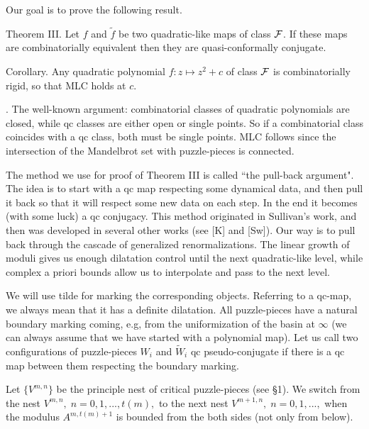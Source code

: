 Our goal is to prove the following result.

\proclaim Theorem III. Let  $f$ and $\tilde f$ be two quadratic-like maps
 of class ${\cal F}$. If these maps are combinatorially
  equivalent then they are quasi-conformally conjugate.

\proclaim Corollary. Any  quadratic polynomial $f: z\mapsto z^2+c$ of 
  class ${\cal F}$ is combinatorially rigid, so that MLC holds at $c$.

. 
The well-known argument: combinatorial classes of quadratic polynomials 
are closed, while qc classes are either open or single points. So if
a combinatorial class coincides with a qc class, both must be single points.
MLC follows since the intersection of the Mandelbrot set with puzzle-pieces
is connected.  \QED 

  

\medskip{} The method we use for proof of 
Theorem III is called ``the pull-back argument". The idea is to start
with a qc map respecting some dynamical data, and then pull it back 
so that it will respect some new data on each step. In the end 
it becomes (with some luck)  a qc conjugacy. This method originated in
Sullivan's work, and then was developed 
in several other works (see [K] and [Sw]). Our way is to pull back
through the cascade of generalized renormalizations. The linear
growth of moduli gives us enough dilatation control until the next
quadratic-like level, while complex a priori bounds
allow us to interpolate  and pass to the next level.

We will use tilde 
for marking the corresponding objects. Referring to a qc-map, we always mean
that it has a definite dilatation. All puzzle-pieces have a natural
boundary marking coming, e.g, from the uniformization of the basin at $\infty$
(we can always assume that we have started with a polynomial map). 
Let us call two configurations of puzzle-pieces
$W_i$ and $\tilde W_i$ qc pseudo-conjugate
if  there is a qc map between them respecting the boundary marking.  

 Let $\{V^{m,n}\}$ be the principle nest of
critical puzzle-pieces (see \S 1). We switch from the
 nest $V^{m,n},\; n=0,1,...,t(m),$ to the next nest
$V^{m+1,n},\; n=0,1,...,$
when the modulus $A^{m,t(m)+1}$ is bounded from the both sides (not only
from below). 

